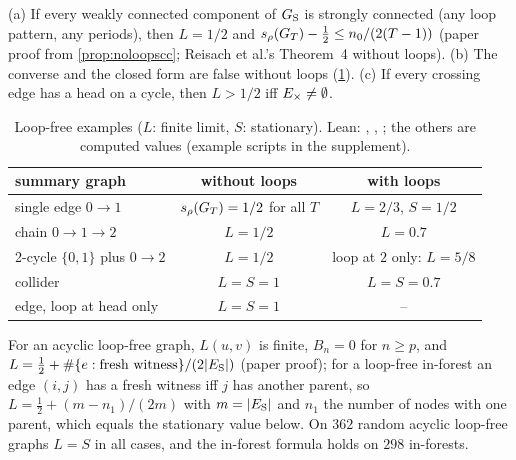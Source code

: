 \begin{corollary}\label{cor:noloopmain}
(a) If every weakly connected component of $G_{\mathrm S}$ is strongly connected (any
loop pattern, any periods), then $L=1/2$ and $s_\rho(G_T)-\tfrac12\le n_0/(2(T-1))$
(paper proof from \cref{prop:noloopscc}; Reisach et al.'s Theorem~4 without
loops). (b) The converse and the closed form are false without loops
(\cref{tab:noloop}). (c) If every crossing edge has a head on a cycle, then
$L>1/2$ iff $E_{\times}\ne\emptyset$.
\end{corollary}
\begin{table}[h]
\caption{Loop-free examples ($L$: finite limit, $S$: stationary). Lean: , , ; the others are computed values (example scripts in the supplement).}
\label{tab:noloop}
\centering\small
\begin{tabular}{lcc}
\toprule
summary graph & without loops & with loops \\
\midrule
single edge $0\to1$ & $s_\rho(G_T)=1/2$ for all $T$ & $L=2/3$, $S=1/2$ \\
chain $0\to1\to2$ & $L=1/2$ & $L=0.7$ \\
2-cycle $\{0,1\}$ plus $0\to2$ & $L=1/2$ & loop at $2$ only: $L=5/8$ \\
collider & $L=S=1$ & $L=S=0.7$ \\
edge, loop at head only & $L=S=1$ & -- \\
\bottomrule
\end{tabular}
\end{table}
For an acyclic loop-free graph, $L(u,v)$ is
finite, $B_n=0$ for $n\ge p$, and $L=\tfrac12+\#\{e:\text{fresh witness}\}/(2|E_{\mathrm S}|)$
(paper proof); for a loop-free in-forest an edge $(i,j)$ has a fresh witness iff
$j$ has another parent, so $L=\tfrac12+(m-n_1)/(2m)$ with $m=|E_{\mathrm S}|$ and $n_1$ the
number of nodes with one parent, which equals the stationary value below. On
$362$ random acyclic loop-free graphs $L=S$ in all cases, and the in-forest
formula holds on $298$ in-forests.

